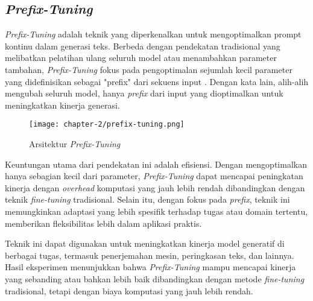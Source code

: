\subsection{\textit{Prefix-Tuning}}

\textit{Prefix-Tuning} adalah teknik yang diperkenalkan untuk mengoptimalkan prompt kontinu dalam generasi teks. Berbeda dengan pendekatan tradisional yang melibatkan pelatihan ulang seluruh model atau menambahkan parameter tambahan, \textit{Prefix-Tuning} fokus pada pengoptimalan sejumlah kecil parameter yang didefinisikan sebagai "prefix" dari sekuens input \parencite{prefix_tuning}. Dengan kata lain, alih-alih mengubah seluruh model, hanya \textit{prefix} dari input yang dioptimalkan untuk meningkatkan kinerja generasi.

\begin{figure}[ht]
    \centering
    \texttt{[image: chapter-2/prefix-tuning.png]}
    \caption{Arsitektur \textit{Prefix-Tuning} \parencite{prefix_tuning}}
    \label{fig:prefix-tuning}
\end{figure}

Keuntungan utama dari pendekatan ini adalah efisiensi. Dengan mengoptimalkan hanya sebagian kecil dari parameter, \textit{Prefix-Tuning} dapat mencapai peningkatan kinerja dengan \textit{overhead} komputasi yang jauh lebih rendah dibandingkan dengan teknik \textit{fine-tuning} tradisional. Selain itu, dengan fokus pada \textit{prefix}, teknik ini memungkinkan adaptasi yang lebih spesifik terhadap tugas atau domain tertentu, memberikan fleksibilitas lebih dalam aplikasi praktis.

Teknik ini dapat digunakan untuk meningkatkan kinerja model generatif di berbagai tugas, termasuk penerjemahan mesin, peringkasan teks, dan lainnya. Hasil eksperimen menunjukkan bahwa \textit{Prefix-Tuning} mampu mencapai kinerja yang sebanding atau bahkan lebih baik dibandingkan dengan metode \textit{fine-tuning} tradisional, tetapi dengan biaya komputasi yang jauh lebih rendah.

